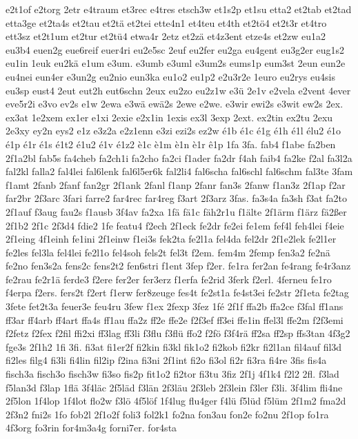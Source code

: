 {e2t1of
e2torg
2etr
e4traum
et3rec
e4tres
etsch3w
et1s2p
et1su
etta2
et2tab
et2tad
etta3ge
et2ta4s
et2tau
et2tä
et2tei
ette4n1
et4teu
et4th
et2tö4
et2t3r
et4tro
ett3sz
et2t1um
et2tur
et2tü4
etwa4r
2etz
et2zä
et4z3ent
etze4s
et2zw
eu1a2
eu3b4
euen2g
eue6reif
euer4ri
eu2e5sc
2euf
eu2fer
eu2ga
eu4gent
eu3g2er
eug1s2
eu1in
1euk
eu2kä
e1um
e3um.
e3umb
e3uml
e3um2s
eums1p
eum3st
2eun
eun2e
eu4nei
eun4er
e3un2g
eu2nio
eun3ka
eu1o2
eu1p2
e2u3r2e
1euro
eu2rys
eu4sis
eu3sp
eust4
2eut
eut2h
eut6schn
2eux
eu2zo
eu2z1w
e3ü
2e1v
e2vela
e2vent
4ever
eve5r2i
e3vo
ev2s
e1w
2ewa
e3wä
ewä2s
2ewe
e2we.
e3wir
ewi2s
e3wit
ew2s
2ex.
ex3at
1e2xem
ex1er
e1xi
2exie
e2x1in
1exis
ex3l
3exp
2ext.
ex2tin
ex2tu
2exu
2e3xy
ey2n
eys2
e1z
e3z2a
e2z1enn
e3zi
ezi2s
ez2w
é1b
é1c
é1g
é1h
é1l
élu2
é1o
é1p
é1r
é1s
é1t2
é1u2
é1v
é1z2
è1c
è1m
è1n
è1r
ê1p
1fa
3fa.
fab4
f1abe
fa2ben
2f1a2bl
fab5s
fa4cheb
fa2ch1i
fa2cho
fa2ci
f1ader
fa2dr
f4ah
faib4
fa2ke
f2al
fa3l2a
fal2kl
falla2
fal4lei
fal6lenk
fal6l5er6k
fal2li4
fal6scha
fal6schl
fal6schm
fal3te
3fam
f1amt
2fanb
2fanf
fan2gr
2f1ank
2fanl
f1anp
2fanr
fan3s
2fanw
f1an3z
2f1ap
f2ar
far2br
2f3arc
3fari
farre2
far4rec
far4reg
f3art
2f3arz
3fas.
fa3s4a
fa3sh
f3at
fa2to
2f1auf
f3aug
fau2s
f1ausb
3f4av
fa2xa
1fä
fä1c
fäh2r1u
f1älte
2f1ärm
f1ärz
fä2ßer
2f1b2
2f1c
2f3d4
fdie2
1fe
featu4
f2ech
2f1eck
fe2dr
fe2ei
fe1em
fef4l
feh4lei
f4eie
2f1eing
4f1einh
fe1ini
2f1einw
f1ei3s
fek2ta
fe2l1a
fel4da
fel2dr
2f1e2lek
fe2l1er
fe2les
fel3la
fel4lei
fe2l1o
fel4soh
fels2t
fel3t
f2em.
fem4m
2femp
fen3a2
fe2nä
fe2no
fen3s2a
fens2c
fens2t2
fen6stri
f1ent
3fep
f2er.
fe1ra
fer2an
fe4rang
fe4r3anz
fe2rau
fe2r1ä
ferde3
f2ere
fer2er
fer3erz
f1erfa
fe2rid
3ferk
f2erl.
4ferneu
fe1ro
f4erpa
f2ers.
fers2t
f2ert
f1erw
fer8zeuge
fes4t
fe2st1a
fe4st3ei
fe2str
2f1eta
fe2tag
3fete
fet2t3a
feuer3e
feu4ru
3few
f1ex
2fexp
3fez
1fé
2f1f
ffa2b
ffa2ce
f3fal
ff1ans
ff3ar
ff4arb
ff4art
ffa4s
ff1au
ffa2z
ff2e
ffe2e
f2f3ef
ff3ei
ffe1in
ffel3l
ffe2m
f2f3emi
f2fetz
f2fex
f2fil
ffi2xi
ff3lag
ff3li
f3flu
f3flü
ffo2
f2fö
f3f4rä
ff2sa
ff2sp
ffs3tan
4f3g2
fge3s
2f1h2
1fi
3fi.
fi3at
fi1er2f
fi2kin
fi3kl
fik1o2
fi2kob
fi2kr
fi2l1an
fil4auf
fil3d
fi2les
filg4
fi3li
fi4lin
fil2ip
f2ina
fi3ni
2f1int
fi2o
fi3ol
fi2r
fi3ra
fi4re
3fis
fis4a
fisch3a
fisch3o
fisch3w
fi3so
fis2p
fit1o2
fi2tor
fi3tu
3fiz
2f1j
4f1k4
f2l2
2fl.
f3lad
f5lan3d
f3lap
1flä
3f4läc
2f5läd
f3län
2f3läu
2f3leb
2f3lein
f3ler
f3li.
3f4lim
fli4ne
2f5lon
1f4lop
1f4lot
flo2w
f3lö
4f5löf
1f4lug
flu4ger
f4lü
f5lüd
f5lüm
2f1m2
fma2d
2f3n2
fni2s
1fo
fob2l
2f1o2f
foli3
fol2k1
fo2na
fon3au
fon2e
fo2nu
2f1op
fo1ra
4f3org
fo3rin
for4m3a4g
forni7er.
for4sta
}
